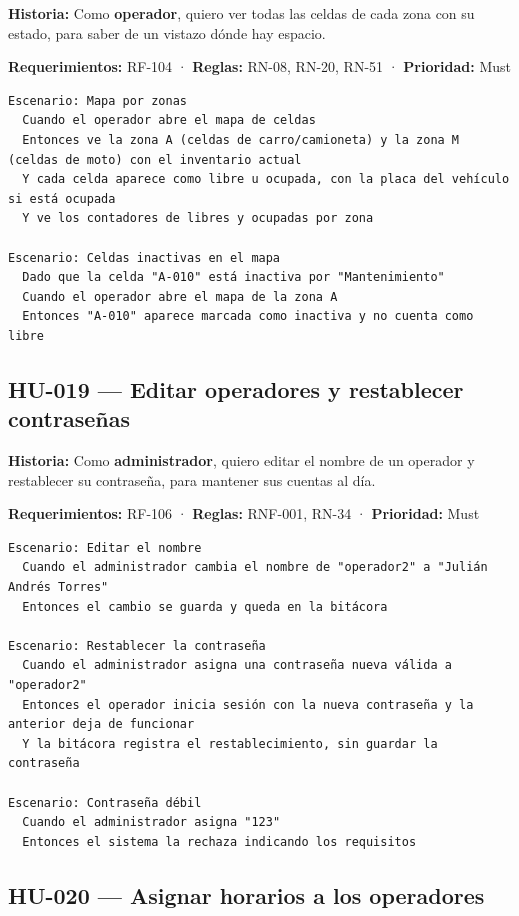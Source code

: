 \textbf{Historia:} Como \textbf{operador}, quiero ver todas las celdas de cada zona con su estado, para saber de un vistazo dónde hay espacio.


\textbf{Requerimientos:} RF-104 · \textbf{Reglas:} RN-08, RN-20, RN-51 · \textbf{Prioridad:} Must


\begin{lstlisting}[style=gherkin]
Escenario: Mapa por zonas
  Cuando el operador abre el mapa de celdas
  Entonces ve la zona A (celdas de carro/camioneta) y la zona M (celdas de moto) con el inventario actual
  Y cada celda aparece como libre u ocupada, con la placa del vehículo si está ocupada
  Y ve los contadores de libres y ocupadas por zona

Escenario: Celdas inactivas en el mapa
  Dado que la celda "A-010" está inactiva por "Mantenimiento"
  Cuando el operador abre el mapa de la zona A
  Entonces "A-010" aparece marcada como inactiva y no cuenta como libre
\end{lstlisting}

\subsection{HU-019 — Editar operadores y restablecer contraseñas}

\textbf{Historia:} Como \textbf{administrador}, quiero editar el nombre de un operador y restablecer su contraseña, para mantener sus cuentas al día.


\textbf{Requerimientos:} RF-106 · \textbf{Reglas:} RNF-001, RN-34 · \textbf{Prioridad:} Must


\begin{lstlisting}[style=gherkin]
Escenario: Editar el nombre
  Cuando el administrador cambia el nombre de "operador2" a "Julián Andrés Torres"
  Entonces el cambio se guarda y queda en la bitácora

Escenario: Restablecer la contraseña
  Cuando el administrador asigna una contraseña nueva válida a "operador2"
  Entonces el operador inicia sesión con la nueva contraseña y la anterior deja de funcionar
  Y la bitácora registra el restablecimiento, sin guardar la contraseña

Escenario: Contraseña débil
  Cuando el administrador asigna "123"
  Entonces el sistema la rechaza indicando los requisitos
\end{lstlisting}

\subsection{HU-020 — Asignar horarios a los operadores}

